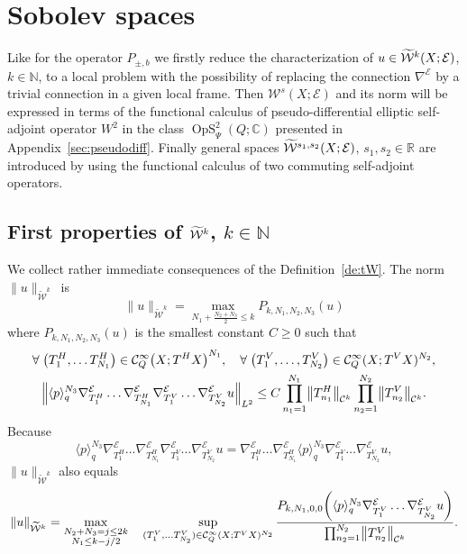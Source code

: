 \documentclass[10pt]{amsart}
\theoremstyle{definition}\newtheorem{defi}[theo]{Definition}\newtheorem{rema}[theo]{Remark}\newtheorem{exam}[theo]{Example}\newtheorem{exem}[theo]{Example}\newtheorem{nota}[theo]{Notation}
\newcommand{\C}{\mathbb{C}}
\newcommand{\R}{\mathbb{R}}
\newcommand{\N}{\mathbb{N}}
\newcommand{\clW}{\mathcal{W}}
\newcommand{\clC}{\mathcal{C}}
\newcommand{\clE}{\mathcal{E}}
\DeclareMathOperator{\OpS}{OpS}
\let\oldtilde\tilde
\renewcommand*{\tilde}[1]{\mathchoice{\widetilde{#1}}{\widetilde{#1}}{\oldtilde{#1}}{\oldtilde{#1}}}
\let\oldforall\forall
\renewcommand*{\forall}{\mathrel{\oldforall}}
\let\originalleft\left
\let\originalright\right
\renewcommand{\left}{\mathopen{}\mathclose\bgroup\originalleft}
\renewcommand{\right}{\aftergroup\egroup\originalright}
\begin{document}
\section{Sobolev spaces}\label{sec:spacesWs}

Like for the operator $P_{\pm,b}$ we firstly reduce the characterization of $u\in\tilde{\clW}^{k}(X;\clE)$, $k\in\N$, to a local problem with the possibility of replacing the connection $\nabla^{\clE}$ by a trivial connection in a given local frame. Then $\clW^{s}(X;\clE)$ and its norm will be expressed in terms of the functional calculus of pseudo-differential elliptic self-adjoint operator $W^{2}$ in the class $\OpS^{2}_{\Psi}(Q;\C)$ presented in Appendix~\ref{sec:pseudodiff}. Finally general spaces $\tilde{\clW}^{s_{1},s_{2}}(X;\clE)$, $s_{1},s_{2}\in \R$ are introduced by using the functional calculus of two commuting self-adjoint operators.

\subsection{First properties of \texorpdfstring{$\tilde{\clW}^k$}{W\^k}, \texorpdfstring{$k\in\N$}{k in N}}\label{sec:firstWk}

We collect rather immediate consequences of the Definition~\ref{de:tW}. The norm $\|u\|_{\widetilde{\clW}^{k}}$~is
\begin{equation}\label{eq:normeNkW}
\|u\|_{\widetilde{\clW}^{k}}=\max_{N_{1}+\frac{N_{2}+N_{3}}{2}\leq k} P_{k,N_{1},N_{2},N_{3}}(u)
\end{equation}
where $P_{k,N_{1},N_{2},N_{3}}(u)$ is the smallest constant $C\geq 0$ such that
\begin{multline*}
\forall \left(T_{1}^{H},\dots T_{N_{1}}^{H}\right)\in \clC^{\infty}_{Q}\left(X;T^{H}X\right)^{N_{1}},\quad \forall \left(T_{1}^{V},\dots, T_{N_{2}}^{V}\right)\in \clC^{\infty}_{Q}(X;T^{V}X)^{N_{2}},\\
\left\|\langle p\rangle_{q}^{N_{3}}\nabla_{T_{1}^{H}}^{\clE}\dots \nabla_{T_{N_{1}}^{H}}^{\clE}\nabla_{T_{1}^{V}}^{\clE}\dots \nabla_{T_{N_{2}}^{V}}^{\clE}u\right\|_{L^{2}}\leq C\prod_{n_{1}=1}^{N_{1}}\left\|T_{n_{1}}^{H}\right\|_{\clC^{k}}\prod_{n_{2}=1}^{N_{2}}\left\|T_{n_{2}}^{V}\right\|_{\clC^{k}}.
\end{multline*}
Because
\[
\langle p\rangle_{q}^{N_{3}}\nabla_{T_{1}^{H}}^{\clE}\dots \nabla_{T_{N_{1}}^{H}}^{\clE}\nabla_{T_{1}^{V}}^{\clE}\dots \nabla_{T_{N_{2}}^{V}}^{\clE}u =
\nabla_{T_{1}^{H}}^{\clE}\dots \nabla_{T_{N_{1}}^{H}}^{\clE}
\langle p\rangle_{q}^{N_{3}}\nabla_{T_{1}^{V}}^{\clE}\dots \nabla_{T_{N_{2}}^{V}}^{\clE}u,
\]
$\|u\|_{\widetilde{\clW}^{k}}$ also equals
\begin{equation}\label{eq:redN1}
\|u\|_{\widetilde{\clW}^{k}}=\max_{\substack{N_{2}+N_{3}=j\leq 2k \\ N_{1}\leq k-j/2 }}
\quad \sup_{(T_{1}^{V},\dots T_{N_{2}}^{V})\in \clC^{\infty}_{Q}(X;T^{V}X)^{N_{2}}}\frac{P_{k,N_{1},0,0}\left(\langle p\rangle_{q}^{N_{3}}\nabla_{T_{1}^{V}}^{\clE}\dots \nabla_{T_{N_{2}}^{V}}^{\clE}u\right)}{\prod_{n_{2}=1}^{N_{2}}\left\|T_{n_{2}}^{V}\right\|_{\clC^{k}}}.
\end{equation}
\end{document}
